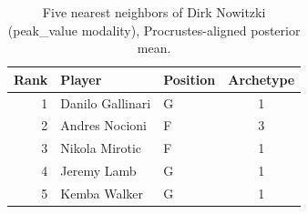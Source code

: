 \begin{table}[htbp]
  \centering\small
  \begin{tabular}{rllc}
    \toprule
    Rank & Player & Position & Archetype \\
    \midrule
    1 & Danilo Gallinari & G & 1 \\
    2 & Andres Nocioni & F & 3 \\
    3 & Nikola Mirotic & F & 1 \\
    4 & Jeremy Lamb & G & 1 \\
    5 & Kemba Walker & G & 1 \\
    \bottomrule
  \end{tabular}
  \caption{Five nearest neighbors of Dirk Nowitzki (peak_value modality), Procrustes-aligned posterior mean.}
  \label{tab:Dirk_Nowitzki_neighbors_peak_value}
\end{table}

